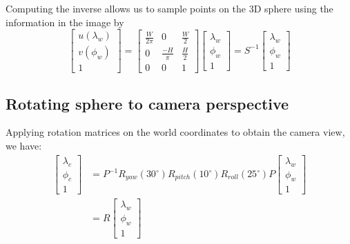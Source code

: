 \documentclass{article}
\begin{document}
Computing the inverse allows us to sample points on the 3D sphere using the information in the image by
$$
\begin{bmatrix}
    u(\lambda_w) \\ v(\phi_w) \\ 1
\end{bmatrix} = 
\begin{bmatrix}
    \frac{W}{2\pi} & 0 & \frac{W}{2} \\
    0 & \frac{-H}{\pi} & \frac{H}{2} \\
    0 & 0 & 1
\end{bmatrix}
\begin{bmatrix}
    \lambda_w \\ \phi_w \\ 1
\end{bmatrix} = 
S^{-1} \begin{bmatrix}
    \lambda_w \\ \phi_w \\ 1
\end{bmatrix}
$$



\subsection{Rotating sphere to camera perspective}
Applying rotation matrices on the world coordinates to obtain the camera view, we have:
\begin{align*}
\begin{bmatrix}
\lambda_c \\ \phi_c \\ 1 
\end{bmatrix} &= 
P^{-1} R_{yaw}(30^\circ) R_{pitch}(10^\circ) R_{roll}(25^\circ) P
\begin{bmatrix}
    \lambda_w \\ \phi_w \\ 1
\end{bmatrix} \\
&= R\begin{bmatrix}
    \lambda_w \\ \phi_w \\ 1
\end{bmatrix}
\end{align*}
\end{document}
